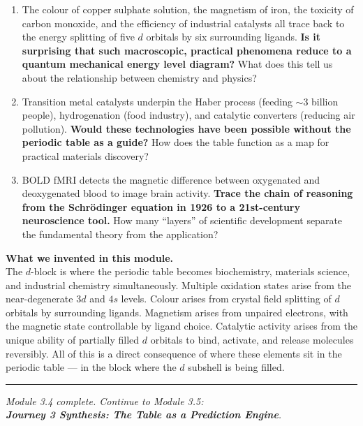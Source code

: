 \documentclass[12pt, a4paper]{book}
\begin{document}
\begin{reflectionbox}
\begin{enumerate}[label=\textbf{R\arabic*.}]
  \item The colour of copper sulphate solution, the magnetism
        of iron, the toxicity of carbon monoxide, and the
        efficiency of industrial catalysts all trace back to
        the energy splitting of five $d$ orbitals by six
        surrounding ligands.
        \textbf{Is it surprising that such macroscopic,
        practical phenomena reduce to a quantum mechanical
        energy level diagram?}
        What does this tell us about the relationship
        between chemistry and physics?

  \item Transition metal catalysts underpin the Haber process
        (feeding $\sim$3 billion people), hydrogenation
        (food industry), and catalytic converters (reducing
        air pollution).
        \textbf{Would these technologies have been possible
        without the periodic table as a guide?}
        How does the table function as a map for
        practical materials discovery?

  \item BOLD fMRI detects the magnetic difference between
        oxygenated and deoxygenated blood to image brain
        activity.
        \textbf{Trace the chain of reasoning from the
        Schr\"{o}dinger equation in 1926 to a 21st-century
        neuroscience tool.}
        How many ``layers'' of scientific development
        separate the fundamental theory from the application?
\end{enumerate}
\end{reflectionbox}

\vspace{1.5em}
\begin{center}
\begin{tcolorbox}[enhanced, colback=DiscoveryColor!8, colframe=DiscoveryColor,
  width=0.88\textwidth, arc=3pt]
\centering\sffamily\small
\textbf{What we invented in this module.}\\[4pt]
The $d$-block is where the periodic table becomes biochemistry,
materials science, and industrial chemistry simultaneously.
Multiple oxidation states arise from the near-degenerate $3d$
and $4s$ levels.
Colour arises from crystal field splitting of $d$ orbitals
by surrounding ligands.
Magnetism arises from unpaired electrons, with the magnetic
state controllable by ligand choice.
Catalytic activity arises from the unique ability of partially
filled $d$ orbitals to bind, activate, and release molecules
reversibly.
All of this is a direct consequence of where these elements
sit in the periodic table --- in the block where the $d$
subshell is being filled.
\end{tcolorbox}
\end{center}

\vspace{2em}
\noindent\textcolor{JourneyColor!40}{\rule{\textwidth}{0.6pt}}
\begin{center}
\textit{\sffamily\small
Module 3.4 complete. Continue to Module 3.5:\\
\textbf{Journey 3 Synthesis: The Table as a Prediction Engine}.}
\end{center}
\end{document}
